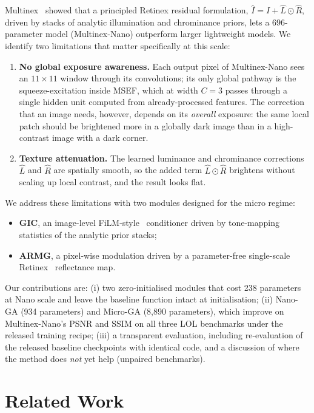 \documentclass[10pt,twocolumn,letterpaper]{article}
\begin{document}
Multinex~\cite{brateanu2026multinex} showed that a principled Retinex residual
formulation, $\hat{I}=I+\hat{L}\odot\hat{R}$, driven by stacks of analytic
illumination and chrominance priors, lets a 696-parameter model (Multinex-Nano)
outperform larger lightweight models. We identify two limitations that matter
specifically at this scale:
\begin{enumerate}
  \item \textbf{No global exposure awareness.} Each output pixel of Multinex-Nano
  sees an $11\times11$ window through its convolutions; its only global pathway is
  the squeeze-excitation inside MSEF, which at width $C{=}3$ passes through a single
  hidden unit computed from already-processed features. The correction that an image
  needs, however, depends on its \emph{overall} exposure: the same local patch
  should be brightened more in a globally dark image than in a high-contrast image
  with a dark corner.
  \item \textbf{Texture attenuation.} The learned luminance and chrominance
  corrections $\hat{L}$ and $\hat{R}$ are spatially smooth, so the added term
  $\hat{L}\odot\hat{R}$ brightens without scaling up local contrast, and the
  result looks flat.
\end{enumerate}

We address these limitations with two modules designed for the micro regime:
\begin{itemize}
  \item \textbf{GIC}, an image-level FiLM-style~\cite{perez2018film} conditioner
  driven by tone-mapping statistics of the analytic prior stacks;
  \item \textbf{ARMG}, a pixel-wise modulation driven by a parameter-free
  single-scale Retinex~\cite{jobson1997ssr} reflectance map.
\end{itemize}
Our contributions are:
(i) two zero-initialised modules that cost 238 parameters at Nano scale and leave
the baseline function intact at initialisation;
(ii) Nano-GA (934 parameters) and Micro-GA (8,890 parameters), which improve on
Multinex-Nano's PSNR and SSIM on all three LOL benchmarks under the released
training recipe;
(iii) a transparent evaluation, including re-evaluation of the released baseline
checkpoints with identical code, and a discussion of where the method does
\emph{not} yet help (unpaired benchmarks).

\section{Related Work}
\end{document}
